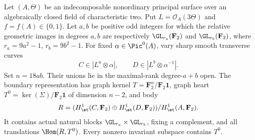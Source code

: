 \begin{proposition}
\label{prop:nonordinary-even-addition-boundary-candidate}
Let $(A,\Theta)$ be an indecomposable nonordinary principal
surface over an algebraically closed field of characteristic
two. Put $L=\mathcal O_A(3\Theta)$ and $f=f(A)\in\{0,1\}$.
Let $a,b$ be positive odd integers for which the relative
geometric images in degrees $a,b$ are respectively
$\GL_{r_a}(\mathbf F_2)$ and $\GL_{r_b}(\mathbf F_2)$, where
$r_a=9a^2-1$, $r_b=9b^2-1$. For fixed $\alpha\in\Pic^0(A)$,
vary sharp smooth transverse curves
\[
       C\in|L^a\otimes\alpha|,\qquad
       D\in|L^b\otimes\alpha^{-1}|.
\]
Set $n=18ab$. Their unions lie in the maximal-rank degree-$a+b$
open. The boundary representation has graph kernel
$T=\mathbf F_2^n/\mathbf F_2\mathbf1$, graph heart
$T^0=\ker(\Sigma)/\mathbf F_2\mathbf1$ of dimension $n-2$,
and body
\[
       R=(H^1_{\et}(C,\mathbf F_2)\oplus
             H^1_{\et}(D,\mathbf F_2))/H^1_{\et}(A,\mathbf F_2).
\]
It contains actual natural blocks $\GL_{r_a}\times\GL_{r_b}$,
fixing a complement, and all translations $\Hom(R,T^0)$.
Every nonzero invariant subspace contains $T^0$.
\end{proposition}
